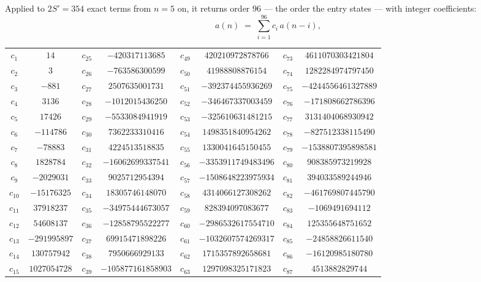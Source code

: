 \documentclass[11pt,a4paper]{article}
\theoremstyle{plain}
\theoremstyle{definition}
\begin{document}
Applied to $2S'=354$ exact terms from $n=5$ on, it returns order $96$ --- the
order the entry states --- with integer coefficients:
\[
a(n)\;=\;\sum_{i=1}^{96}c_i\,a(n-i),
\]
\begin{center}\small
\begin{tabular}{cccccccc}
$c_{1}$ & $14$ & $c_{25}$ & $-420317113685$ & $c_{49}$ & $420210972878766$ & $c_{73}$ & $4611070303421804$ \\
$c_{2}$ & $3$ & $c_{26}$ & $-763586300599$ & $c_{50}$ & $41988808876154$ & $c_{74}$ & $1282284974797450$ \\
$c_{3}$ & $-881$ & $c_{27}$ & $2507635001731$ & $c_{51}$ & $-392374455936269$ & $c_{75}$ & $-4244556461327889$ \\
$c_{4}$ & $3136$ & $c_{28}$ & $-1012015436250$ & $c_{52}$ & $-346467337003459$ & $c_{76}$ & $-171808662786396$ \\
$c_{5}$ & $17426$ & $c_{29}$ & $-5533084941919$ & $c_{53}$ & $-325610631481215$ & $c_{77}$ & $3131404068930942$ \\
$c_{6}$ & $-114786$ & $c_{30}$ & $7362233310416$ & $c_{54}$ & $1498351840954262$ & $c_{78}$ & $-827512338115490$ \\
$c_{7}$ & $-78883$ & $c_{31}$ & $4224513518835$ & $c_{55}$ & $1330041645150455$ & $c_{79}$ & $-1538807395898581$ \\
$c_{8}$ & $1828784$ & $c_{32}$ & $-16062699337541$ & $c_{56}$ & $-3353911749483496$ & $c_{80}$ & $908385973219928$ \\
$c_{9}$ & $-2029031$ & $c_{33}$ & $9025712954394$ & $c_{57}$ & $-1508648223975934$ & $c_{81}$ & $394033589244946$ \\
$c_{10}$ & $-15176325$ & $c_{34}$ & $18305746148070$ & $c_{58}$ & $4314066127308262$ & $c_{82}$ & $-461769807445790$ \\
$c_{11}$ & $37918237$ & $c_{35}$ & $-34975444673057$ & $c_{59}$ & $828394097083677$ & $c_{83}$ & $-1069491694112$ \\
$c_{12}$ & $54608137$ & $c_{36}$ & $-12858795522277$ & $c_{60}$ & $-2986532617554710$ & $c_{84}$ & $125355648751652$ \\
$c_{13}$ & $-291995897$ & $c_{37}$ & $69915471898226$ & $c_{61}$ & $-1032607574269317$ & $c_{85}$ & $-24858826611540$ \\
$c_{14}$ & $130757942$ & $c_{38}$ & $7950666929133$ & $c_{62}$ & $1715357892658681$ & $c_{86}$ & $-16120985180780$ \\
$c_{15}$ & $1027054728$ & $c_{39}$ & $-105877161858903$ & $c_{63}$ & $1297098325171823$ & $c_{87}$ & $4513882829744$ \\

\end{tabular}
\end{center}
\end{document}
